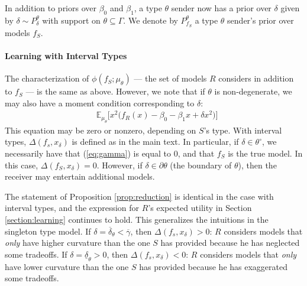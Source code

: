 \documentclass[11pt,dvipsnames]{article}
\begin{document}
\begin{appendix}
In addition to priors over $\beta_0$ and $\beta_1$, a type $\theta$ sender now has a prior over $\delta$ given by $\delta \sim P_\delta^\theta$ with support on $\theta \subseteq \Gamma$.
We denote by $P_{f_S}^\theta$ a type $\theta$ sender's prior over models $f_S$.

\paragraph{Learning with Interval Types}
The characterization of $\phi(f_S;\mu_\theta)$ --- the set of models $R$ considers in addition to $f_S$ --- is the same as above.
However, we note that if $\theta$ is non-degenerate, we may also have a moment condition corresponding to $\delta$:
\begin{align}
&\mathbb{E}_{\mu_\theta}\big[x^2\big(f_R(x)-\beta_0-\beta_1 x+\delta x^2 \big)\big]
\label{eq:gamma}
\end{align}
This equation may be zero or nonzero, depending on $S$'s type.
With interval types, $\Delta(f_s,x_\delta)$ is defined as in the main text.
In particular, if $\delta \in \theta^\circ$, we necessarily have that (\ref{eq:gamma}) is equal to $0$, and that $f_S$ is the true model.
In this case, $\Delta(f_S,x_\delta)=0$.
However, if $\delta \in \partial \theta$ (the boundary of $\theta$), then the receiver may entertain additional models.

The statement of Proposition \ref{prop:reduction} is identical in the case with interval types, and the expression for $R$'s expected utility in Section \ref{section:learning} continues to hold.
This generalizes the intuitions in the singleton type model.
If $\delta = \overline{\delta}_\theta<\overline{\gamma}$, then $\Delta(f_s,x_\delta)>0$: $R$ considers models that \emph{only} have higher curvature than the one $S$ has provided because he has neglected some tradeoffs.
If $\delta = \underline{\delta}_\theta>0$, then $\Delta(f_s,x_\delta)<0$: $R$ considers models that \emph{only} have lower curvature than the one $S$ has provided because he has exaggerated some tradeoffs.


\end{appendix}
\end{document}
